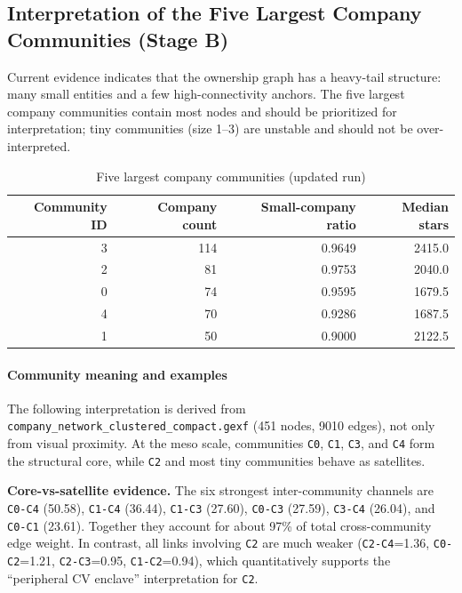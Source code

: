 \documentclass[11pt]{article}
\begin{document}
\subsection{Interpretation of the Five Largest Company Communities (Stage B)}
Current evidence indicates that the ownership graph has a heavy-tail structure:
many small entities and a few high-connectivity anchors.
The five largest company communities contain most nodes and should be prioritized for interpretation; tiny communities (size 1--3) are unstable and should not be over-interpreted.

\begin{table}[h]
\centering
\caption{Five largest company communities (updated run)}
\begin{tabular}{rrrr}
\toprule
Community ID & Company count & Small-company ratio & Median stars \\
\midrule
3 & 114 & 0.9649 & 2415.0 \\
2 & 81  & 0.9753 & 2040.0 \\
0 & 74  & 0.9595 & 1679.5 \\
4 & 70  & 0.9286 & 1687.5 \\
1 & 50  & 0.9000 & 2122.5 \\
\bottomrule
\end{tabular}
\label{tab:top-company-communities}
\end{table}

\paragraph{Community meaning and examples}
The following interpretation is derived from \texttt{company\_network\_clustered\_compact.gexf} (451 nodes, 9010 edges), not only from visual proximity.
At the meso scale, communities \texttt{C0}, \texttt{C1}, \texttt{C3}, and \texttt{C4} form the structural core, while \texttt{C2} and most tiny communities behave as satellites.

\textbf{Core-vs-satellite evidence.}
The six strongest inter-community channels are
\texttt{C0-C4} (50.58), \texttt{C1-C4} (36.44), \texttt{C1-C3} (27.60),
\texttt{C0-C3} (27.59), \texttt{C3-C4} (26.04), and \texttt{C0-C1} (23.61).
Together they account for about 97\% of total cross-community edge weight.
In contrast, all links involving \texttt{C2} are much weaker
(\texttt{C2-C4}=1.36, \texttt{C0-C2}=1.21, \texttt{C2-C3}=0.95, \texttt{C1-C2}=0.94),
which quantitatively supports the ``peripheral CV enclave'' interpretation for \texttt{C2}.
\end{document}
